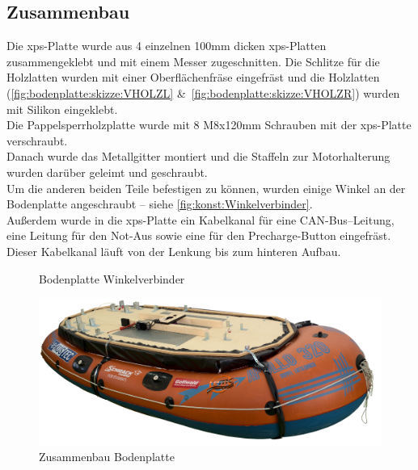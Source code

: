 \subsection{Zusammenbau}
Die \ac{xps}-Platte wurde aus 4 einzelnen 100mm dicken \ac{xps}-Platten zusammengeklebt und mit einem Messer zugeschnitten. Die Schlitze für die Holzlatten wurden mit einer Oberflächenfräse eingefräst und die Holzlatten (\autoref{fig:bodenplatte:skizze:VHOLZL} \&\ \autoref{fig:bodenplatte:skizze:VHOLZR}) wurden mit Silikon eingeklebt.\\
Die Pappelsperrholzplatte wurde mit 8 M8x120mm Schrauben mit der \ac{xps}-Platte verschraubt.\\
Danach wurde das Metallgitter montiert und die Staffeln zur Motorhalterung wurden darüber geleimt und geschraubt.\\
Um die anderen beiden Teile befestigen zu können, wurden einige Winkel an der Bodenplatte angeschraubt -- siehe \autoref{fig:konst:Winkelverbinder}.\\
Außerdem wurde in die \ac{xps}-Platte ein Kabelkanal für eine CAN-Bus--Leitung, eine Leitung für den Not-Aus sowie eine für den Precharge-Button eingefräst. Dieser Kabelkanal läuft von der Lenkung bis zum hinteren Aufbau.
\begin{figure}[H]
    \centering
    \caption{Bodenplatte Winkelverbinder\label{fig:konst:Winkelverbinder}}    
\end{figure}
\begin{figure}[H]
    \centering
    \includegraphics[width=.99\textwidth]{Fotos/Konstruktion/DSC_8622.png}
    \caption{Zusammenbau Bodenplatte \label{fig:konst:bodenplatte_zusammenbau}}    
\end{figure}
